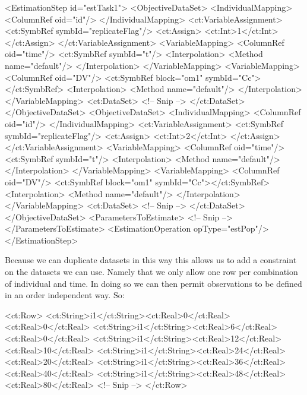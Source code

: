 \documentclass[a4paper,11pt]{article}
\begin{document}
\begin{xmlcode}
<EstimationStep id="estTask1">
    <ObjectiveDataSet>
        <IndividualMapping>
            <ColumnRef oid="id"/>
        </IndividualMapping>
        <ct:VariableAssignment>
            <ct:SymbRef symbId="replicateFlag"/>
            <ct:Assign>
                <ct:Int>1</ct:Int>
            </ct:Assign>
        </ct:VariableAssignment>
        <VariableMapping>
            <ColumnRef oid="time"/>
            <ct:SymbRef symbId="t"/>
            <Interpolation>
                <Method name="default"/>
            </Interpolation>
        </VariableMapping>
        <VariableMapping>
            <ColumnRef oid="DV"/>
            <ct:SymbRef block="om1" symbId="Cc"></ct:SymbRef>
            <Interpolation>
                <Method name="default"/>
            </Interpolation>
        </VariableMapping>
        <ct:DataSet>
            <!-- Snip -->
        </ct:DataSet>
    </ObjectiveDataSet>
    <ObjectiveDataSet>
        <IndividualMapping>
            <ColumnRef oid="id"/>
        </IndividualMapping>
        <ct:VariableAssignment>
            <ct:SymbRef symbId="replicateFlag"/>
            <ct:Assign>
                <ct:Int>2</ct:Int>
            </ct:Assign>
        </ct:VariableAssignment>
        <VariableMapping>
            <ColumnRef oid="time"/>
            <ct:SymbRef symbId="t"/>
            <Interpolation>
                <Method name="default"/>
            </Interpolation>
        </VariableMapping>
        <VariableMapping>
            <ColumnRef oid="DV"/>
            <ct:SymbRef block="om1" symbId="Cc"></ct:SymbRef>
            <Interpolation>
                <Method name="default"/>
            </Interpolation>
        </VariableMapping>
        <ct:DataSet>
            <!-- Snip -->
        </ct:DataSet>
    </ObjectiveDataSet>
    <ParametersToEstimate>
      <!-- Snip -->
    </ParametersToEstimate>
    <EstimationOperation opType="estPop"/>
</EstimationStep>
\end{xmlcode}
% 
Because we can duplicate datasets in this way this allows us to add a
constraint on the datasets we can use. Namely that we only allow one 
row per combination of individual and time. In doing so we can
then permit observations to be defined in an order independent
way. So:
%
\begin{xmlcode}
<ct:Row>
    <ct:String>i1</ct:String><ct:Real>0</ct:Real><ct:Real>0</ct:Real>
    <ct:String>i1</ct:String><ct:Real>6</ct:Real><ct:Real>0</ct:Real>
    <ct:String>i1</ct:String><ct:Real>12</ct:Real><ct:Real>10</ct:Real>
    <ct:String>i1</ct:String><ct:Real>24</ct:Real><ct:Real>20</ct:Real>
    <ct:String>i1</ct:String><ct:Real>36</ct:Real><ct:Real>40</ct:Real>
    <ct:String>i1</ct:String><ct:Real>48</ct:Real><ct:Real>80</ct:Real>
    <!-- Snip -->
</ct:Row>
\end{xmlcode}
\end{document}
